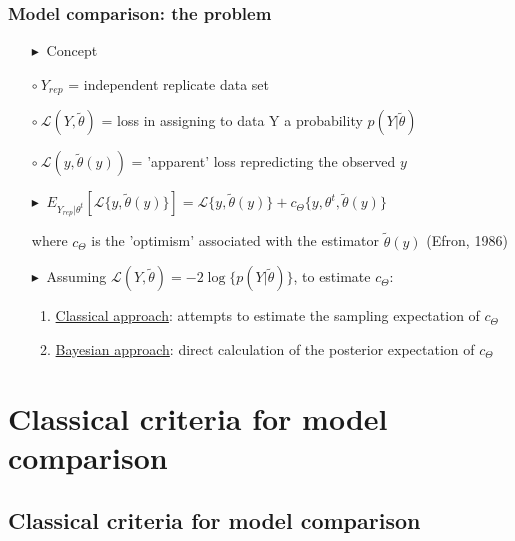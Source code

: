 \documentclass[9pt]{beamer}  %
\newcommand{\bluetri}{\textcolor{Beaverblue}{$\blacktriangleright \ $}}
\newcommand{\bluecircle}{\textcolor{Beaverblue}{$\circ \ $}}
\begin{document}

\begin{frame}[t]
\frametitle{Model comparison: the problem}

\begin{itemize}
   \item[\bluetri] Concept
    \item[]\bluecircle $Y_{rep}$ = independent replicate data set
    \item[]\bluecircle $\mathcal{L}(Y,\tilde{\theta})$ = loss in assigning to data Y a probability $p(Y|\tilde{\theta})$
    \item[]\bluecircle $\mathcal{L}(y,\tilde{\theta}(y))$ = 'apparent' loss repredicting the observed $y$
   \vspace{0.2cm}
   \item[\bluetri] $E_{Y_{rep}|\theta^t}[\mathcal{L}\{y,\tilde{\theta}(y)\}] = \mathcal{L}\{y,\tilde{\theta}(y)\}+c_{\Theta}\{y,\theta^t,\tilde{\theta}(y)\}$
    \item[] \hspace{0.1cm} where $c_{\Theta}$ is the 'optimism' associated with the estimator $\tilde{\theta}(y)$ (Efron, 1986)
    \vspace{0.2cm}
   \item[\bluetri] Assuming $\mathcal{L}(Y,\tilde{\theta}) = -2\log\{p(Y|\tilde{\theta})\}$, to estimate $c_{\Theta}$:
    \vspace{0.2cm}
    \begin{enumerate}
        \item \underline{Classical approach}: attempts to estimate the sampling expectation of $c_{\Theta}$
        \vspace{0.2cm}
        \item \underline{Bayesian approach}: direct calculation of the posterior expectation of $c_{\Theta}$
    \end{enumerate}    
\end{itemize}
  \vspace{1cm}

\end{frame}


\section[Classical criteria for model comparison]{Classical criteria for model comparison}
\subsection*{Classical criteria for model comparison}
\end{document}
